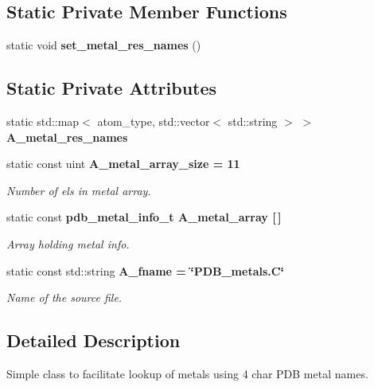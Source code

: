 \subsection*{Static Private Member Functions}
\begin{CompactItemize}
\item 
static void \textbf{set\_\-metal\_\-res\_\-names} ()\label{classASCbase_1_1PDB__metals_4ffdb3ab19bc7e0cada024aad6a67e4f}

\end{CompactItemize}
\subsection*{Static Private Attributes}
\begin{CompactItemize}
\item 
static std::map$<$ atom\_\-type, std::vector$<$ std::string $>$ $>$ \textbf{A\_\-metal\_\-res\_\-names}\label{classASCbase_1_1PDB__metals_fa89d3ce277a4a989980b06aeaacea34}

\item 
static const uint \bf{A\_\-metal\_\-array\_\-size} = 11\label{classASCbase_1_1PDB__metals_c28f7415de1f2b6dec44ff26bd6698a1}

\begin{CompactList}\small\item\em Number of els in metal array. \item\end{CompactList}\item 
static const \bf{pdb\_\-metal\_\-info\_\-t} \bf{A\_\-metal\_\-array} [$\,$]
\begin{CompactList}\small\item\em Array holding metal info. \item\end{CompactList}\item 
static const std::string \bf{A\_\-fname} = \char`\"{}PDB\_\-metals.C\char`\"{}\label{classASCbase_1_1PDB__metals_04a5ba744abde48e1a57da373dd6d1d2}

\begin{CompactList}\small\item\em Name of the source file. \item\end{CompactList}\end{CompactItemize}


\subsection{Detailed Description}
Simple class to facilitate lookup of metals using 4 char PDB metal names. 



